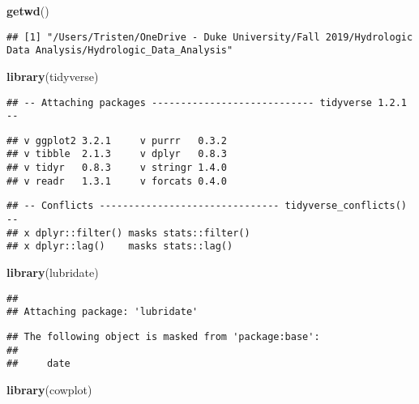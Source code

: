 \documentclass[]{article}
\newenvironment{Shaded}{\begin{snugshade}}{\end{snugshade}}
\newcommand{\KeywordTok}[1]{\textcolor[rgb]{0.13,0.29,0.53}{\textbf{#1}}}
\newcommand{\NormalTok}[1]{#1}
\begin{document}
\begin{Shaded}
\begin{Highlighting}[]
\KeywordTok{getwd}\NormalTok{()}
\end{Highlighting}
\end{Shaded}

\begin{verbatim}
## [1] "/Users/Tristen/OneDrive - Duke University/Fall 2019/Hydrologic Data Analysis/Hydrologic_Data_Analysis"
\end{verbatim}

\begin{Shaded}
\begin{Highlighting}[]
\KeywordTok{library}\NormalTok{(tidyverse)}
\end{Highlighting}
\end{Shaded}

\begin{verbatim}
## -- Attaching packages ---------------------------- tidyverse 1.2.1 --
\end{verbatim}

\begin{verbatim}
## v ggplot2 3.2.1     v purrr   0.3.2
## v tibble  2.1.3     v dplyr   0.8.3
## v tidyr   0.8.3     v stringr 1.4.0
## v readr   1.3.1     v forcats 0.4.0
\end{verbatim}

\begin{verbatim}
## -- Conflicts ------------------------------- tidyverse_conflicts() --
## x dplyr::filter() masks stats::filter()
## x dplyr::lag()    masks stats::lag()
\end{verbatim}

\begin{Shaded}
\begin{Highlighting}[]
\KeywordTok{library}\NormalTok{(lubridate)  }
\end{Highlighting}
\end{Shaded}

\begin{verbatim}
## 
## Attaching package: 'lubridate'
\end{verbatim}

\begin{verbatim}
## The following object is masked from 'package:base':
## 
##     date
\end{verbatim}

\begin{Shaded}
\begin{Highlighting}[]
\KeywordTok{library}\NormalTok{(cowplot)}
\end{Highlighting}
\end{Shaded}
\end{document}
